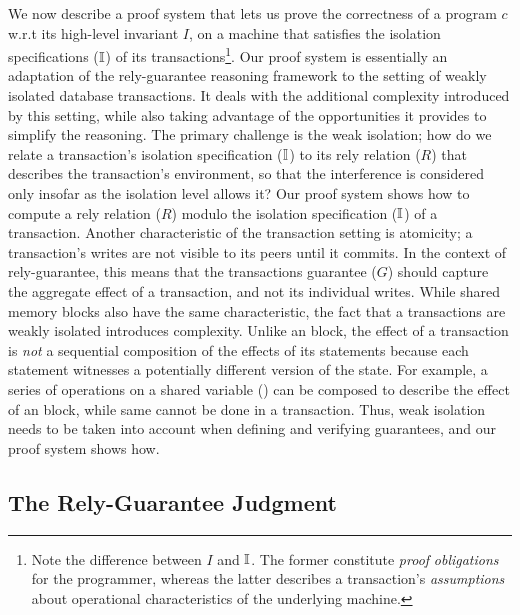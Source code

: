 We now describe a proof system that lets us prove the correctness of a
\txnimp program $c$ w.r.t its high-level invariant $I$, on a machine
that satisfies the isolation specifications ($\mathbb{I}$) of its
transactions\footnote{Note the difference between $I$ and $\mathbb{I}$. The
former constitute \emph{proof} \emph{obligations} for the programmer,
whereas the latter describes a transaction's \emph{assumptions} about
operational characteristics of the underlying machine.}.  Our proof
system is essentially an adaptation of the rely-guarantee reasoning
framework to the setting of weakly isolated database transactions. It
deals with the additional complexity introduced by this setting, while
also taking advantage of the opportunities it provides to simplify the
reasoning. The primary challenge is the weak isolation; how do we
relate a transaction's isolation specification ($\mathbb{I}$) to its rely
relation ($R$) that describes the transaction's environment, so that
the interference is considered only insofar as the isolation level
allows it? Our proof system shows how to compute a rely relation ($R$)
modulo the isolation specification ($\mathbb{I}$) of a transaction. Another
characteristic of the transaction setting is atomicity; a
transaction's writes are not visible to its peers until it commits. In
the context of rely-guarantee, this means that the transactions
guarantee ($G$) should capture the aggregate effect of a transaction,
and not its individual writes.  While shared memory  blocks
also have the same characteristic, the fact that a transactions are
weakly isolated introduces complexity.  Unlike an  block,
the effect of a transaction is \emph{not} a sequential composition of
the effects of its statements because each statement witnesses a
potentially different version of the state. For example,  a series of
operations on a shared variable () can be composed to describe
the effect of an  block, while same cannot be done in a
transaction. Thus, weak isolation needs to be taken into account when
defining and verifying guarantees, and our proof system shows how. 

\subsection{The Rely-Guarantee Judgment}
\label{sec:rely-guarantee}



